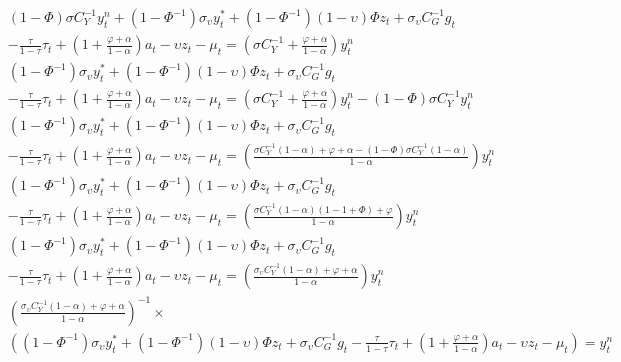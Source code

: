 \begin{align}    
    &(1 - \Phi)\sigma C_Y^{-1} y^n_t +(1 - \Phi^{-1}) \sigma_\upsilon y^*_t + (1 - \Phi^{-1}) (1-\upsilon)\Phi z_t + \sigma_\upsilon C_G^{-1} g_t \nonumber \\
        &- \frac{\tau}{1-\tau}\tau_t  + \left(1 + \frac{\varphi + \alpha}{1-\alpha}\right)a_t - \upsilon z_t -\mu_t = \left(\sigma C_Y^{-1} + \frac{\varphi + \alpha}{1-\alpha}\right)y^n_t\\
    &(1 - \Phi^{-1}) \sigma_\upsilon y^*_t + (1 - \Phi^{-1}) (1-\upsilon)\Phi z_t + \sigma_\upsilon C_G^{-1} g_t \nonumber \\ 
        &- \frac{\tau}{1-\tau}\tau_t  + \left(1 + \frac{\varphi + \alpha}{1-\alpha}\right)a_t - \upsilon z_t -\mu_t = \left(\sigma C_Y^{-1} + \frac{\varphi + \alpha}{1-\alpha}\right)y^n_t - (1 - \Phi)\sigma C_Y^{-1} y^n_t\\
    &(1 - \Phi^{-1}) \sigma_\upsilon y^*_t + (1 - \Phi^{-1}) (1-\upsilon)\Phi z_t + \sigma_\upsilon C_G^{-1} g_t \nonumber \\ 
        &- \frac{\tau}{1-\tau}\tau_t  + \left(1 + \frac{\varphi + \alpha}{1-\alpha}\right)a_t - \upsilon z_t -\mu_t = \left(\frac{\sigma C_Y^{-1}(1-\alpha) + \varphi + \alpha-(1-\Phi)\sigma C_Y^{-1}(1-\alpha)}{1-\alpha}\right)y^n_t\\
    &(1 - \Phi^{-1}) \sigma_\upsilon y^*_t + (1 - \Phi^{-1}) (1-\upsilon)\Phi z_t + \sigma_\upsilon C_G^{-1} g_t \nonumber \\ 
        &- \frac{\tau}{1-\tau}\tau_t  + \left(1 + \frac{\varphi + \alpha}{1-\alpha}\right)a_t - \upsilon z_t -\mu_t = \left(\frac{\sigma C_Y^{-1}(1-\alpha)(1 - 1 + \Phi) + \varphi}{1-\alpha}\right)y^n_t\\
    &(1 - \Phi^{-1}) \sigma_\upsilon y^*_t + (1 - \Phi^{-1}) (1-\upsilon)\Phi z_t + \sigma_\upsilon C_G^{-1} g_t \nonumber \\ 
        &- \frac{\tau}{1-\tau}\tau_t  + \left(1 + \frac{\varphi + \alpha}{1-\alpha}\right)a_t - \upsilon z_t -\mu_t = \left(\frac{\sigma_\upsilon C_Y^{-1}(1-\alpha) + \varphi + \alpha}{1-\alpha}\right)y^n_t\\
    &\left(\frac{\sigma_\upsilon C_Y^{-1}(1-\alpha) + \varphi + \alpha}{1-\alpha}\right)^{-1}\times \nonumber \\ 
        &\left((1 - \Phi^{-1}) \sigma_\upsilon y^*_t + (1 - \Phi^{-1}) (1-\upsilon)\Phi z_t + \sigma_\upsilon C_G^{-1} g_t - \frac{\tau}{1-\tau}\tau_t  + \left(1 + \frac{\varphi + \alpha}{1-\alpha}\right)a_t - \upsilon z_t -\mu_t \right)= y^n_t\\

\end{align}

